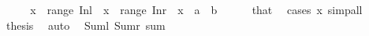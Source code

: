 \begin{isabellebody}
%
\isadelimproof
%
\endisadelimproof
%
\isatagproof
{}\isamarkupfalse%
\ {\isacharminus}{\kern0pt}\isanewline
\ \ \isamarkupfalse%
\ {\isachardoublequoteopen}x\ {\isasymin}\ range\ Inl{\isachardoublequoteclose}\ \ {\isachardoublequoteopen}x\ {\isasymnotin}\ range\ Inr{\isachardoublequoteclose}\ \ x\ {\isacharcolon}{\kern0pt}{\isacharcolon}{\kern0pt}\ {\isachardoublequoteopen}{\isacharprime}{\kern0pt}a\ {\isacharplus}{\kern0pt}\ {\isacharprime}{\kern0pt}b{\isachardoublequoteclose}\isanewline
\ \ \ \ \isamarkupfalse%
\ that\ \isamarkupfalse%
\ {\isacharparenleft}{\kern0pt}cases\ x{\isacharparenright}{\kern0pt}\ simp{\isacharunderscore}{\kern0pt}all\isanewline
\ \ \isamarkupfalse%
\ \isamarkupfalse%
\ {\isacharquery}{\kern0pt}thesis\ \isamarkupfalse%
\ auto\isanewline
{}\isamarkupfalse%
%
\endisatagproof
{\isafoldproof}%
%
\isadelimproof
\isanewline
%
\endisadelimproof
\isanewline
{}\isamarkupfalse%
\ {\isacharparenleft}{\kern0pt}\ Suml\ Sumr\ sum\isanewline
%
\isadelimtheory
\isanewline
%
\endisadelimtheory
%
\isatagtheory
{}\isamarkupfalse%
%
\endisatagtheory
{\isafoldtheory}%
%
\isadelimtheory
%
\endisadelimtheory
%
\end{isabellebody}%
\endinput
